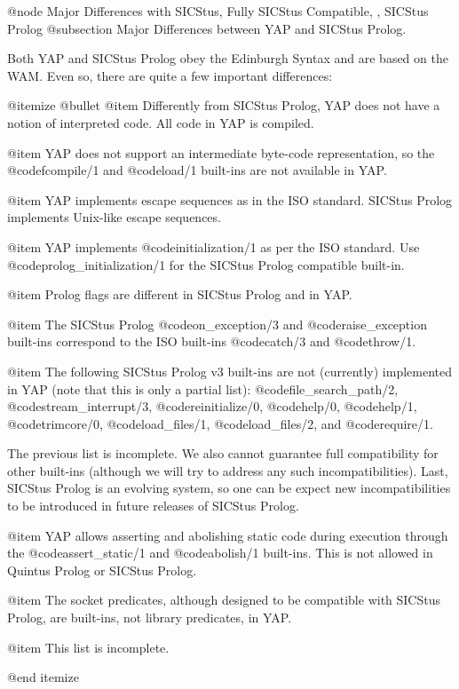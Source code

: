 {{{{{{{{{@node Major Differences with SICStus, Fully SICStus Compatible, , SICStus Prolog
@subsection Major Differences between YAP and SICStus Prolog.

Both YAP and SICStus Prolog obey the Edinburgh Syntax and are based on
the WAM. Even so, there are quite a few important differences:

@itemize @bullet
@item Differently from SICStus Prolog, YAP does not have a
notion of interpreted code. All code in YAP is compiled.

@item YAP does not support an intermediate byte-code
representation, so the @code{fcompile/1} and @code{load/1} built-ins are
not available in YAP.

@item YAP implements escape sequences as in the ISO standard. SICStus
Prolog implements Unix-like escape sequences.

@item YAP implements @code{initialization/1} as per the ISO
standard. Use @code{prolog_initialization/1} for the SICStus Prolog
compatible built-in.

@item Prolog flags are different in SICStus Prolog and in YAP.

@item The SICStus Prolog @code{on_exception/3} and
@code{raise_exception} built-ins correspond to the ISO built-ins
@code{catch/3} and @code{throw/1}.

@item The following SICStus Prolog v3 built-ins are not (currently)
implemented in YAP (note that this is only a partial list):
@code{file_search_path/2},
@code{stream_interrupt/3}, @code{reinitialize/0}, @code{help/0},
@code{help/1}, @code{trimcore/0}, @code{load_files/1},
@code{load_files/2}, and @code{require/1}.

      The previous list is incomplete. We also cannot guarantee full
compatibility for other built-ins (although we will try to address any
such incompatibilities). Last, SICStus Prolog is an evolving system, so
one can be expect new incompatibilities to be introduced in future
releases of SICStus Prolog.

@item YAP allows asserting and abolishing static code during
execution through the @code{assert_static/1} and @code{abolish/1}
built-ins. This is not allowed in Quintus Prolog or SICStus Prolog.

@item The socket predicates, although designed to be compatible with
SICStus Prolog, are built-ins, not library predicates, in YAP.

@item This list is incomplete.

@end itemize

}}}}}}}}}
